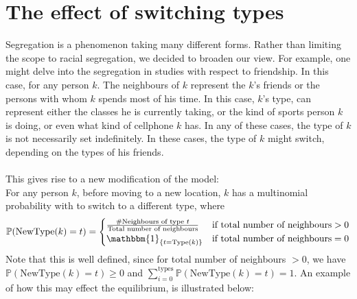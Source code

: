 \section{The effect of switching types}
\label{section:switch}
Segregation is a phenomenon taking many different forms. Rather than  limiting the scope to racial segregation, we decided to broaden our view. 
For example, one might delve into the segregation in studies with respect to friendship. 
In this case, for any person \(k\). The neighbours of \(k\) represent the \(k\)'s friends or the persons with whom \(k\) spends most of his time.
In this case, \(k\)'s type, can represent either the classes he is currently taking, or the kind of sports person \(k\) is doing, or even what kind of cellphone \(k\) has.
In any of these cases, the type of \(k\) is not necessarily set indefinitely.
In these cases, the type of \(k\) might switch, depending on the types of his friends.\\
\\
This gives rise to a new modification of the model:\\
For any person \(k\), before moving to a new location, \(k\) has a multinomial probability with to switch to a different type, where 
\[\mathbb{P}(\text{NewType}(k)=t) = \begin{cases} 
 \frac{\#\text{Neighbours of type }t}{\text{Total number of neighbours}}	&\mbox{if } \text{total number of neighbours}>0 \\ 
\mathbbm{1}_{\{t=\text{Type}(k)\}}   &\mbox{if } \text{total number of neighbours}=0
\end{cases}\]
Note that this is well defined, since for total number of neighbours \(> 0\), we have \( \mathbb{P}(\text{NewType}(k)=t) \geq 0\) and \(\sum_{i=0}^{\text{types}}\mathbb{P}(\text{NewType}(k)=t)=1\). An example of how this may effect the equilibrium, is illustrated below:
